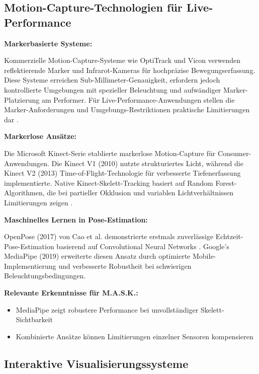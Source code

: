 
\subsection{Motion-Capture-Technologien für Live-Performance}

\textbf{Markerbasierte Systeme:}

Kommerzielle Motion-Capture-Systeme wie OptiTrack und Vicon verwenden reflektierende Marker und Infrarot-Kameras für hochpräzise Bewegungserfassung. Diese Systeme erreichen Sub-Millimeter-Genauigkeit, erfordern jedoch kontrollierte Umgebungen mit spezieller Beleuchtung und aufwändiger Marker-Platzierung am Performer. Für Live-Performance-Anwendungen stellen die Marker-Anforderungen und Umgebungs-Restriktionen praktische Limitierungen dar \cite{kitagawa2017mocap}.

\textbf{Markerlose Ansätze:}

Die Microsoft Kinect-Serie etablierte markerlose Motion-Capture für Consumer-Anwendungen. Die Kinect V1 (2010) nutzte strukturiertes Licht, während die Kinect V2 (2013) Time-of-Flight-Technologie für verbesserte Tiefenerfassung implementierte. Native Kinect-Skelett-Tracking basiert auf Random Forest-Algorithmen, die bei partieller Okklusion und variablen Lichtverhältnissen Limitierungen zeigen \cite{shotton2011real}.

\textbf{Maschinelles Lernen in Pose-Estimation:}

OpenPose (2017) von Cao et al. demonstrierte erstmals zuverlässige Echtzeit-Pose-Estimation basierend auf Convolutional Neural Networks \cite{cao2017realtime}. Google's MediaPipe (2019) erweiterte diesen Ansatz durch optimierte Mobile-Implementierung und verbesserte Robustheit bei schwierigen Beleuchtungsbedingungen.

\textbf{Relevante Erkenntnisse für M.A.S.K.:}
\begin{itemize}
    \item MediaPipe zeigt robustere Performance bei unvollständiger Skelett-Sichtbarkeit
    \item Kombinierte Ansätze können Limitierungen einzelner Sensoren kompensieren
\end{itemize}

\subsection{Interaktive Visualisierungssysteme}

